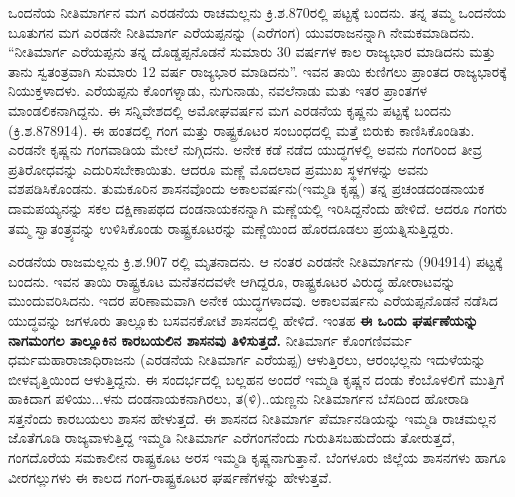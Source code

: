 ಒಂದನೆಯ ನೀತಿಮಾರ್ಗನ ಮಗ ಎರಡನೆಯ ರಾಚಮಲ್ಲನು ಕ್ರಿ.ಶ.870ರಲ್ಲಿ ಪಟ್ಟಕ್ಕೆ ಬಂದನು. ತನ್ನ ತಮ್ಮ ಒಂದನೆಯ ಬೂತುಗನ ಮಗ ಎರಡನೇ ನೀತಿಮಾರ್ಗ ಎರೆಯಪ್ಪನನ್ನು (ಎರೆಗಂಗ) ಯುವರಾಜನನ್ನಾಗಿ ನೇಮಕಮಾಡಿದನು. “ನೀತಿಮಾರ್ಗ ಎರೆಯಪ್ಪನು ತನ್ನ ದೊಡ್ಡಪ್ಪನೊಡನೆ ಸುಮಾರು 30 ವರ್ಷಗಳ ಕಾಲ ರಾಜ್ಯಭಾರ ಮಾಡಿದನು ಮತ್ತು ತಾನು ಸ್ವತಂತ್ರವಾಗಿ ಸುಮಾರು 12 ವರ್ಷ ರಾಜ್ಯಭಾರ ಮಾಡಿದನು”. ಇವನ ತಾಯಿ ಕುಣಿಗಲು ಪ್ರಾಂತದ ರಾಜ್ಯಭಾರಕ್ಕೆ ನಿಯುಕ್ತಳಾದಳು. ಎರೆಯಪ್ಪನು ಕೊಂಗಳ್ನಾಡು, ನುಗುನಾಡು, ನವಲೆನಾಡು ಮತು ಇತರ ಪ್ರಾಂತಗಳ ಮಾಂಡಲಿಕನಾಗಿದ್ದನು. ಈ ಸನ್ನಿವೇಶದಲ್ಲಿ ಅಮೋಘವರ್ಷನ ಮಗ ಎರಡನೆಯ ಕೃಷ್ಣನು ಪಟ್ಟಕ್ಕೆ ಬಂದನು (ಕ್ರಿ.ಶ.878\enginline{-}914). ಈ ಹಂತದಲ್ಲಿ ಗಂಗ ಮತ್ತು ರಾಷ್ಟ್ರಕೂಟರ ಸಂಬಂಧದಲ್ಲಿ ಮತ್ತೆ ಬಿರುಕು ಕಾಣಿಸಿಕೊಂಡಿತು. ಎರಡನೇ ಕೃಷ್ಣನು ಗಂಗವಾಡಿಯ ಮೇಲೆ ನುಗ್ಗಿದನು. ಅನೇಕ ಕಡೆ ನಡೆದ ಯುದ್ಧಗಳಲ್ಲಿ ಅವನು ಗಂಗರಿಂದ ತೀವ್ರ ಪ್ರತಿರೋಧವನ್ನು ಎದುರಿಸಬೇಕಾಯಿತು. ಆದರೂ ಮಣ್ಣೆ ಮೊದಲಾದ ಪ್ರಮುಖ ಸ್ಥಳಗಳನ್ನು ಅವನು ವಶಪಡಿಸಿಕೊಂಡನು. ತುಮಕೂರಿನ ಶಾಸನವೊಂದು ಅಕಾಲವರ್ಷನು(ಇಮ್ಮಡಿ ಕೃಷ್ಣ) ತನ್ನ ಪ್ರಚಂಡದಂಡನಾಯಕ ದಾಮಪಯ್ಯನನ್ನು ಸಕಲ ದಕ್ಷಿಣಾಪಥದ ದಂಡನಾಯಕನನ್ನಾಗಿ ಮಣ್ಣೆಯಲ್ಲಿ ಇರಿಸಿದ್ದನೆಂದು ಹೇಳಿದೆ. ಆದರೂ ಗಂಗರು ತಮ್ಮ ಸ್ವಾತಂತ್ರ್ಯವನ್ನು ಉಳಿಸಿಕೊಂಡು ರಾಷ್ಟ್ರಕೂಟರನ್ನು ಮಣ್ಣೆಯಿಂದ ಹೊರದೂಡಲು ಪ್ರಯತ್ನಿಸುತ್ತಿದ್ದರು.

ಎರಡನೆಯ ರಾಜಮಲ್ಲನು ಕ್ರಿ.ಶ.907 ರಲ್ಲಿ ಮೃತನಾದನು. ಆ ನಂತರ ಎರಡನೇ ನೀತಿಮಾರ್ಗನು (904\enginline{-}914) ಪಟ್ಟಕ್ಕೆ ಬಂದನು. ಇವನ ತಾಯಿ ರಾಷ್ಟ್ರಕೂಟ ಮನೆತನದವಳೇ ಆಗಿದ್ದರೂ, ರಾಷ್ಟ್ರಕೂಟರ ವಿರುದ್ಧ ಹೋರಾಟವನ್ನು ಮುಂದುವರಿಸಿದನು. ಇದರ ಪರಿಣಾಮವಾಗಿ ಅನೇಕ ಯುದ್ಧಗಳಾದವು. ಅಕಾಲವರ್ಷನು ಎರೆಯಪ್ಪನೊಡನೆ ನಡೆಸಿದ ಯುದ್ಧವನ್ನು ಜಗಳೂರು ತಾಲ್ಲೂಕು ಬಸವನಕೋಟೆ ಶಾಸನದಲ್ಲಿ ಹೇಳಿದೆ. ಇಂತಹ \textbf{ಈ ಒಂದು ಘರ್ಷಣೆಯನ್ನು ನಾಗಮಂಗಲ ತಾಲ್ಲೂಕಿನ ಕಾರಬಯಲಿನ ಶಾಸನವು ತಿಳಿಸುತ್ತದೆ.} ನೀತಿಮಾರ್ಗ ಕೊಂಗಣಿವರ್ಮ ಧರ್ಮಮಹಾರಾಜಾಧಿ\-ರಾಜನು (ಎರಡನೆಯ ನೀತಿಮಾರ್ಗ ಎರೆಯಪ್ಪ) ಆಳುತ್ತಿರಲು, ಆರಂಭಲ್ಲನು ಇದುಳೆಯನ್ನು ಬೀಳವೃತ್ತಿಯಿಂದ ಆಳುತ್ತಿದ್ದನು. ಈ ಸಂದರ್ಭದಲ್ಲಿ ಬಲ್ಲಹನ ಅಂದರೆ ಇಮ್ಮಡಿ ಕೃಷ್ಣನ ದಂಡು ಕೆಂಬೊಳಲಿಗೆ ಮುತ್ತಿಗೆ ಹಾಕಿದಾಗ ಪಳಿಯು...ಳನು ದಂಡನಾಯಕನಾಗಿರಲು, ತ(ಳಿ)..ಯಣ್ಣನು ನೀತಿಮಾರ್ಗನ ಬೆಸದಿಂದ ಹೋರಾಡಿ ಸತ್ತನೆಂದು ಕಾರಬಯಲು ಶಾಸನ ಹೇಳುತ್ತದೆ. ಈ ಶಾಸನದ ನೀತಿಮಾರ್ಗ ಪೆರ್ಮಾನಡಿಯನ್ನು ಇಮ್ಮಡಿ ರಾಚಮಲ್ಲನ ಜೊತೆಗೂಡಿ ರಾಜ್ಯವಾಳುತ್ತಿದ್ದ ಇಮ್ಮಡಿ ನೀತಿಮಾರ್ಗ ಎರೆಗಂಗನೆಂದು ಗುರುತಿಸಬಹುದೆಂದು ತೋರುತ್ತದೆ, ಗಂಗದೊರೆಯ ಸಮಕಾಲೀನ ರಾಷ್ಟ್ರಕೂಟ ಅರಸ ಇಮ್ಮಡಿ ಕೃಷ್ಣನಾಗು\-ತ್ತಾನೆ. ಬೆಂಗಳೂರು ಜಿಲ್ಲೆಯ ಶಾಸನಗಳು ಹಾಗೂ ವೀರಗಲ್ಲುಗಳು ಈ ಕಾಲದ ಗಂಗ-ರಾಷ್ಟ್ರಕೂಟರ ಘರ್ಷಣೆಗಳನ್ನು ಹೇಳುತ್ತವೆ.

